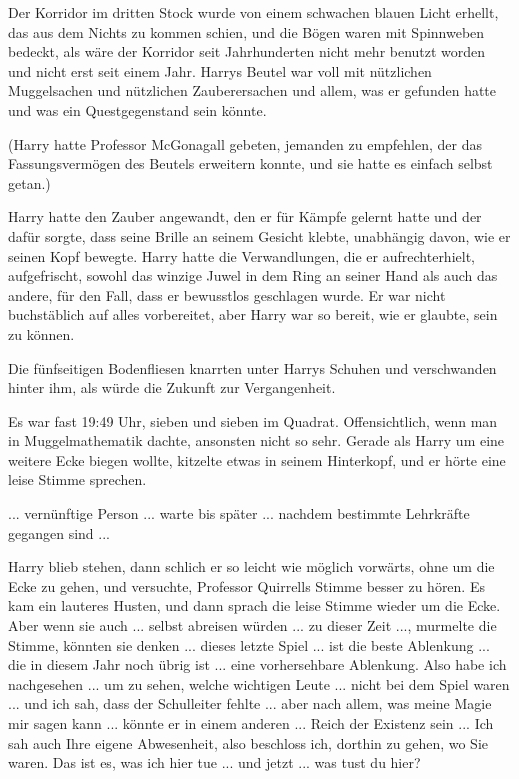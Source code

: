 Der Korridor im dritten Stock wurde von einem schwachen blauen Licht erhellt,
das aus dem Nichts zu kommen schien, und die Bögen waren mit Spinnweben bedeckt,
als wäre der Korridor seit Jahrhunderten nicht mehr benutzt worden und nicht
erst seit einem Jahr. Harrys Beutel war voll mit nützlichen Muggelsachen und
nützlichen Zauberersachen und allem, was er gefunden hatte und was ein
Questgegenstand sein könnte.

(Harry hatte Professor McGonagall gebeten, jemanden zu empfehlen, der das
Fassungsvermögen des Beutels erweitern konnte, und sie hatte es einfach selbst
getan.)

Harry hatte den Zauber angewandt, den er für Kämpfe gelernt hatte und der dafür
sorgte, dass seine Brille an seinem Gesicht klebte, unabhängig davon, wie er
seinen Kopf bewegte. Harry hatte die Verwandlungen, die er aufrechterhielt,
aufgefrischt, sowohl das winzige Juwel in dem Ring an seiner Hand als auch das
andere, für den Fall, dass er bewusstlos geschlagen wurde. Er war nicht
buchstäblich auf alles vorbereitet, aber Harry war so bereit, wie er glaubte,
sein zu können.

Die fünfseitigen Bodenfliesen knarrten unter Harrys Schuhen und verschwanden
hinter ihm, als würde die Zukunft zur Vergangenheit.

Es war fast 19:49 Uhr, sieben und sieben im Quadrat. Offensichtlich, wenn man in
Muggelmathematik dachte, ansonsten nicht so sehr. Gerade als Harry um eine
weitere Ecke biegen wollte, kitzelte etwas in seinem Hinterkopf, und er hörte
eine leise Stimme sprechen.

\glqq{}... vernünftige Person ... warte bis später ... nachdem bestimmte Lehrkräfte
gegangen sind ...\grqq{}

Harry blieb stehen, dann schlich er so leicht wie möglich vorwärts, ohne um die
Ecke zu gehen, und versuchte, Professor Quirrells Stimme besser zu hören. Es kam
ein lauteres Husten, und dann sprach die leise Stimme wieder um die Ecke. \glqq{}
Aber wenn sie auch ... selbst abreisen würden ... zu dieser Zeit ...\grqq{},
murmelte die Stimme, \glqq{}könnten sie denken ... dieses letzte Spiel ... ist die
beste Ablenkung ... die in diesem Jahr noch übrig ist ... eine vorhersehbare
Ablenkung. Also habe ich nachgesehen ... um zu sehen, welche wichtigen Leute ...
nicht bei dem Spiel waren ... und ich sah, dass der Schulleiter fehlte ... aber
nach allem, was meine Magie mir sagen kann ... könnte er in einem anderen ...
Reich der Existenz sein ... Ich sah auch Ihre eigene Abwesenheit, also beschloss
ich, dorthin zu gehen, wo Sie waren. Das ist es, was ich hier tue ... und
jetzt ... was tust du hier?\grqq{}

